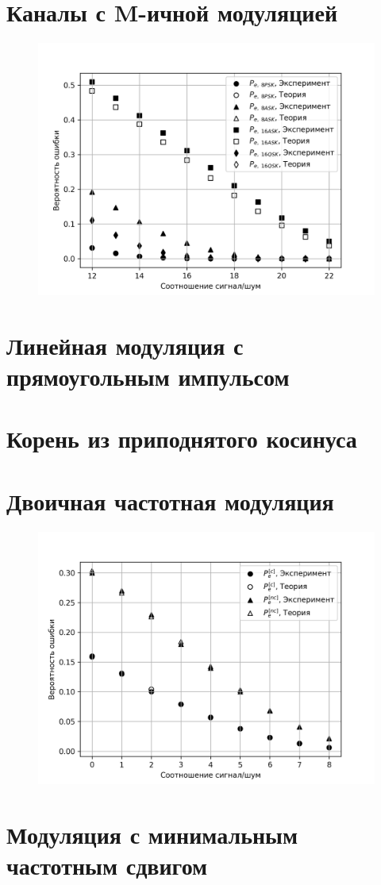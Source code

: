 \documentclass[14pt, a4paper]{article}
\begin{document}
\section{Каналы с M-ичной модуляцией}

\begin{figure}[H]
\centering
\includegraphics[width=.6\linewidth]{../images/rt2-5}
\end{figure}

\section{Линейная модуляция с прямоугольным импульсом}

\section{Корень из приподнятого косинуса}

\section{Двоичная частотная модуляция}

\begin{figure}[H]
\centering
\includegraphics[width=.6\linewidth]{../images/rt2-8}
\end{figure}

\section{Модуляция с минимальным частотным сдвигом}
\end{document}
